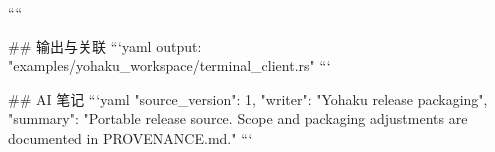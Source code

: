 ````

## 输出与关联
```yaml
output: "examples/yohaku_workspace/terminal_client.rs"
```

## AI 笔记
```yaml
{"source_version": 1, "writer": "Yohaku release packaging", "summary": "Portable release source. Scope and packaging adjustments are documented in PROVENANCE.md."}
```
